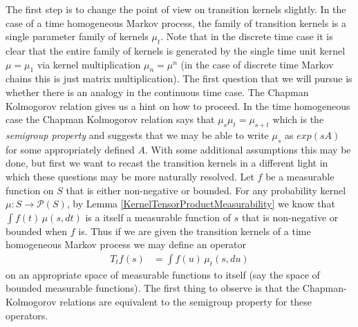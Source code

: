 The first step is to change the point of view on transition kernels
slightly.  In the case of a time homogeneous Markov process, the
family of transition kernels is a single parameter family of kernels
$\mu_t$.  Note that in the discrete time case it is clear that the
entire family of kernels is generated by the single time unit kernel
$\mu = \mu_1$ via kernel multiplication $\mu_n = \mu^{n}$ (in
the case of discrete time Markov chains this is just matrix multiplication).  The
first question that we will pursue is whether there is an analogy in
the continuous time case.  The Chapman Kolmogorov relation gives us a
hint on how to proceed.  In the time homogeneous case the Chapman
Kolmogorov relation says that $\mu_s \mu_t = \mu_{s+t}$ which is the
\emph{semigroup property} and suggests that we may be able to write
$\mu_s$ as $exp(s A)$ for some appropriately defined $A$.  With
some additional assumptions this may be done, but first we want to
recast the transition kernels in a different light in which these
questions may be more naturally resolved.  Let $f$ be a measurable
function on $S$ that is either non-negative or bounded.  For any
probability kernel $\mu : S \to \mathcal{P}(S)$, by
Lemma \ref{KernelTensorProductMeasurability} we know that $\int f(t)
\, \mu(s,dt)$ is a itself a measurable function of $s$ that is non-negative
or bounded when $f$ is.  Thus if we are given the transition kernels
of a time homogeneous Markov process we may define an operator 
\begin{align*}
T_tf (s) &= \int f(u) \, \mu_t(s, du) 
\end{align*} 
on an appropriate space of measurable
functions to itself (say the space of bounded measurable functions).  The first thing to observe is that the
Chapman-Kolmogorov relations are equivalent to the semigroup property
for these operators.

